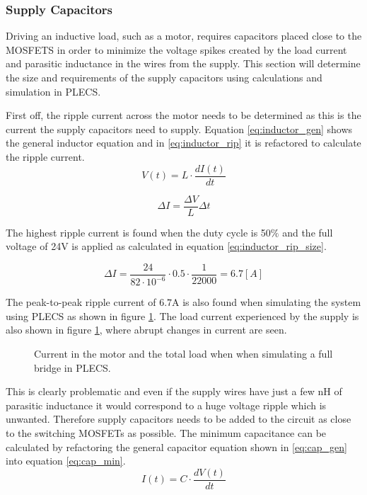 \subsubsection{Supply Capacitors}
\label{ssub:sup_caps}
Driving an inductive load, such as a motor, requires capacitors placed close to the MOSFETS in order to minimize the voltage spikes created by the load current and parasitic inductance in the wires from the supply.
This section will determine the size and requirements of the supply capacitors using calculations and simulation in PLECS.

First off, the ripple current across the motor needs to be determined as this is the current the supply capacitors need to supply.
Equation \ref{eq:inductor_gen} shows the general inductor equation and in \ref{eq:inductor_rip} it is refactored to calculate the ripple current.
\begin{equation}
	V(t) = L \cdot \frac{dI(t)}{dt}
	\label{eq:inductor_gen}
\end{equation}

\begin{equation}
	\Delta I = \frac{\Delta V}{L} \Delta t
	\label{eq:inductor_rip}
\end{equation}

The highest ripple current is found when the duty cycle is 50$\%$ and the full voltage of 24V is applied as calculated in equation \ref{eq:inductor_rip_size}.

\begin{equation}
	\Delta I = \frac{24}{82\cdot 10^{-6}} \cdot 0.5 \cdot \frac{1}{22000} = 6.7 [A] 
	\label{eq:inductor_rip_size}
\end{equation}

The peak-to-peak ripple current of $6.7$A is also found when simulating the system using PLECS as shown in figure \ref{fig:sim_currents}.
The load current experienced by the supply is also shown in figure \ref{fig:sim_currents}, where abrupt changes in current are seen. 

\begin{figure}[h]
	\centering
	
	\caption[Simulating motor and load currents in Plecs.]{Current in the motor and the total load when when simulating a full bridge in PLECS.}
	\label{fig:sim_currents}
\end{figure}

This is clearly problematic and even if the supply wires have just a few nH of parasitic inductance it would correspond to a huge voltage ripple which is unwanted. 
Therefore supply capacitors needs to be added to the circuit as close to the switching MOSFETs as possible.
The minimum capacitance can be calculated by refactoring the general capacitor equation shown in \ref{eq:cap_gen} into equation \ref{eq:cap_min}.
\begin{equation} 
	I(t) = C \cdot \frac{dV(t)}{dt}
	\label{eq:cap_gen}
\end{equation}

